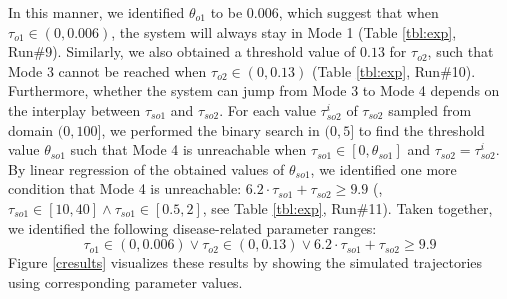 In this manner, we identified $\theta_{o1}$ to be $0.006$, which suggest that when $\tau_{o1} \in (0, 0.006)$, the system will always stay in Mode 1 (Table \ref{tbl:exp}, Run\#9). Similarly, we also obtained a threshold value of $0.13$ for $\tau_{o2}$, such that Mode 3 cannot be reached when $\tau_{o2} \in (0, 0.13)$ (Table \ref{tbl:exp}, Run\#10). Furthermore, whether the system can jump from Mode 3 to Mode 4 depends on the interplay between $\tau_{so1}$ and $\tau_{so2}$.  For each value $\tau_{so2}^i$ of $\tau_{so2}$ sampled from domain $(0, 100]$, we performed the binary search in $(0, 5]$ to find the threshold value $\theta_{so1}$ such that Mode 4 is unreachable when $\tau_{so1} \in [0,\theta_{so1}]$ and $\tau_{so2} = {\tau_{so2}^i}$. By linear regression of the obtained values of $\theta_{so1}$, we identified one more condition that Mode 4 is unreachable:  $6.2 \cdot \tau_{so1} + \tau_{so2} \ge 9.9$ (\eg,  $\tau_{so1} \in [10, 40] \wedge \tau_{so1}\in [0.5, 2]$, see Table \ref{tbl:exp}, Run\#11). Taken together, we identified the following disease-related parameter ranges:
$$\tau_{o1} \in (0,0.006)\vee \tau_{o2} \in (0,0.13)\vee 6.2 \cdot \tau_{so1} + \tau_{so2} \ge 9.9$$
Figure \ref{cresults} visualizes these results by showing the simulated trajectories using corresponding  parameter values.





